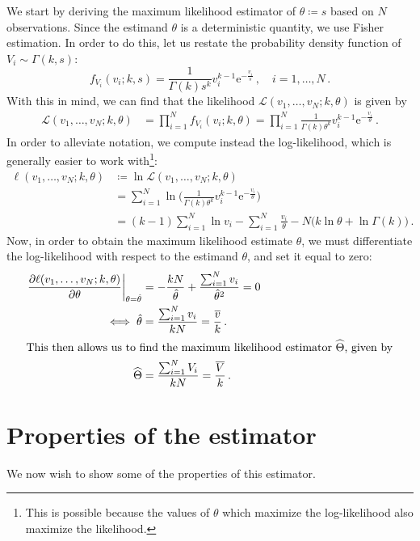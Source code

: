 \documentclass[final]{aomart}
\newtheorem[{}\it]{thm}{Theorem}[section]
\theoremstyle{definition}
\newtheorem*[{}\it]{notation}{Notation}
\numberwithin{equation}{section}
\newcommand{\wh}{\widehat}
\newcommand{\like}{\mathcal{L}} %
\newcommand{\e}{\mathrm{e}} %
\newcommand{\pdf}{f} %
\newcommand{\htheta}{\hat{\theta}} %
\newcommand{\hTheta}{\wh{\Theta}} %
\newcommand{\eval}[2][\right]{\relax
  \ifx#1\right\relax \left.\fi#2#1\rvert}
\begin{document}
We start by deriving the maximum likelihood estimator of \(\theta \coloneqq s\) based on \(N\) observations.
Since the estimand $\theta$ is a deterministic quantity, we use Fisher estimation.
In order to do this, let us restate the probability density function of \(V_i \sim \Gamma(k, s)\):
\begin{equation}
\pdf_{V_i}(v_i; k, s) = \frac{1}{\Gamma(k) s^k} v_i^{k-1} \e^{-\frac{v_i}{s}}\,, \quad i = 1, \ldots, N\,.
\end{equation}
With this in mind, we can find that the likelihood \(\like(v_1, \ldots, v_N; k, \theta)\) is given by
\begin{align}
\like(v_1, \ldots, v_N; k, \theta) &= \prod_{i=1}^{N} \pdf_{V_i}(v_i; k,\theta) = \prod_{i=1}^{N} \frac{1}{\Gamma(k) \theta^k} v_i^{k-1} \e^{-\frac{v_i}{\theta}}\,.
\end{align}
In order to alleviate notation, we compute instead the log-likelihood, which is generally easier to work with\footnote{This is possible because the values of \(\theta\) which maximize the log-likelihood also maximize the likelihood.}:
\begin{align}
\ell(v_1, \ldots, v_N; k, \theta) &\coloneqq \ln \like(v_1, \ldots, v_N; k, \theta)\\
&= \sum_{i=1}^{N} \ln\Bigg(\frac{1}{\Gamma(k) \theta^k} v_i^{k-1} \e^{-\frac{v_i}{\theta}}\Bigg)\\
&= (k-1) \sum_{i=1}^{N}\ln v_i - \sum_{i=1}^{N} \frac{v_i}{\theta} - N \big(k \ln \theta + \ln \Gamma(k)\big)\,.\label{eq:loglikelihood}
\end{align}
Now, in order to obtain the maximum likelihood estimate \(\htheta\), we must differentiate the log-likelihood with respect to the estimand \(\theta\), and set it equal to zero:
\begin{align}
\eval{\frac{\partial \ell(v_1, \ldots, v_N; k, \theta)}{\partial \theta}}_{\theta = \htheta} &= -\frac{kN}{\htheta} + \frac{\sum_{i=1}^{N} v_i}{\htheta^2} = 0\\
\iff \htheta &= \frac{\sum_{i=1}^{N} v_i}{kN} = \frac{\widebar{v}}{k}\,.\\
\intertext{This then allows us to find the maximum likelihood estimator \(\hTheta\), given by}
\hTheta &= \frac{\sum_{i=1}^{N} V_i}{kN} = \frac{\widebar{V}}{k}\,.\label{eq:mlestimator}
\end{align}

\section{Properties of the estimator}
We now wish to show some of the properties of this estimator.
\end{document}
